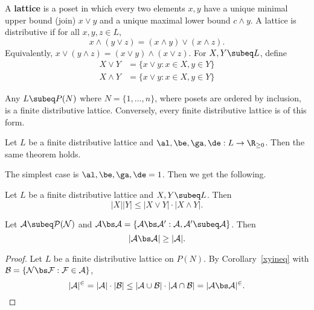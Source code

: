 \begin{df}
A \textbf{lattice} is a poset in which every two elements $x,y$ have a unique minimal upper bound (join) $x\vee y$ and a unique maximal lower bound $c\wedge y$. A lattice is distributive if for all $x,y,z\in L$, 
\[
x\wedge(y\vee z)=(x\wedge y)\vee (x\wedge z).
\]
Equivalently, $x\vee (y\wedge z)=(x\vee y)\wedge (x\vee z)$. For $X,Y\subeq L$, define
\begin{align*}
X\vee Y&=\{x\vee y:x\in X,y\in Y\}\\
X\wedge Y&=\{x\vee y:x\in X,y\in Y\}
\end{align*}
\end{df}
Any $L\subeq P(N)$ where $N=\{1,\ldots, n\}$, where posets are ordered by inclusion, is a finite distributive lattice.%
Conversely, every finite distributive lattice is of this form.

\begin{cor}
Let $L$ be a finite distributive lattice and $\al,\be,\ga, \de:L\to \R_{\ge0}$. Then the same theorem holds.
\end{cor}
The simplest case is $\al,\be,\ga,\de=1$. Then we get the following.
\begin{cor}\label{xyineq}
Let $L$ be a finite distributive lattice and $X,Y\subeq L$. Then
\[
|X||Y|\le |X\vee Y|\cdot |X\wedge Y|.
\]
\end{cor}
\begin{cor}
Let $\cal A\subeq P(N)$ and $\cal A\bs\cal A=\{A\bs A':A,A'\subeq \cal A\}$. Then
\[
|\cal A\bs \cal A|\ge |\cal A|.
\]
\end{cor}
\begin{proof}
Let $L$ be a finite distributive lattice on $P(N)$. By Corollary~\ref{xyineq} with $\cal B=\{N\bs F:F\in \cal A\}$,
\[
|\cal A|^2=|\cal A|\cdot |\cal B|\le |\cal A\cup \cal B|\cdot |\cal A\cap \cal B|=|A\bs\cal A|^2.
\]
\end{proof}
